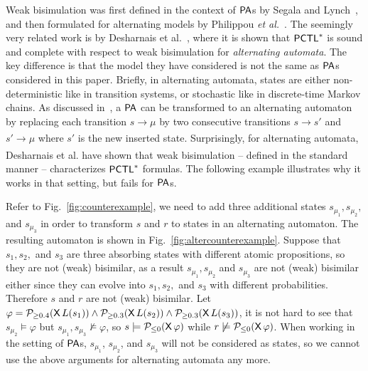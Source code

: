 \documentclass{LMCS}
\def\phi{\varphi}
\DeclareMathOperator{\X}{\text{\sf X}}
\newcommand{\TRANA}[3]{#1\xrightarrow[]{#2}#3}
\newcommand{\PA}{{\sf PA}}
\newcommand{\PCTL}{{\sf PCTL}}
\newcommand{\MC}[1]{\mathcal{#1}}
\begin{document}
Weak bisimulation was first defined in the context of $\PA$s by
Segala and Lynch~\cite{SegalaL95}, and then formulated for alternating models by
Philippou \emph{et al.}~\cite{PhilippouLS00}.
The seemingly very related work is by Desharnais et
al.~\cite{DesharnaisGJP10}, where it is shown that $\PCTL^{*}$ is sound and
complete with respect to weak bisimulation for \emph{alternating
automata}. The key difference is that the model they have considered is not
the same as $\PA$s considered in this paper. Briefly,
in alternating automata, states are either non-deterministic like in
transition systems, or stochastic like in discrete-time Markov chains.
As discussed in~\cite{SegalaT05}, a $\PA$ can be
transformed to an alternating automaton by replacing each transition
$\TRANA{s}{}{ \mu}$ by two consecutive transitions $\TRANA{s}{}{s'}$
and $\TRANA{s'}{}{\mu}$ where $s'$ is the new inserted
state. Surprisingly, for alternating automata, Desharnais et al. have
shown that weak bisimulation -- defined in the standard manner --
characterizes $\PCTL^{*}$ formulas. The following example illustrates why it
works in that setting, but fails for $\PA$s.
\begin{exa}\label{ex:alternative PA}
  Refer to Fig.~\ref{fig:counterexample}, we need to add three
  additional states $s_{\mu_1},s_{\mu_2},$ and $s_{\mu_3}$ in order to
  transform $s$ and $r$ to states in an alternating automaton. 
  The resulting
  automaton is shown in Fig.~\ref{fig:altercounterexample}.  Suppose
  that $s_1,s_2,$ and $s_3$ are three absorbing states with different
  atomic propositions, so they are not (weak) bisimilar, as a result
  $s_{\mu_1},s_{\mu_2}$ and $s_{\mu_3}$ are not (weak) bisimilar
  either since they can evolve into $s_1,s_2,$ and $s_3$ with
  different probabilities. Therefore $s$ and $r$ are not (weak)
  bisimilar. Let $\phi=\MC{P}_{\geq0.4}(\X L(s_1))\land
  \MC{P}_{\geq0.3}(\X L(s_2))\land \MC{P}_{\geq0.3}(\X L(s_3))$, it is
  not hard to see that $s_{\mu_2}\models\phi$ but
  $s_{\mu_1},s_{\mu_3}\not\models\phi$, so $s\models \MC{P}_{\leq
    0}(\X\phi)$ while $r\not\models\MC{P}_{\leq 0}(\X\phi)$. When
  working in the setting of $\PA$s, $s_{\mu_1}$,
  $s_{\mu_2}$, and $s_{\mu_3}$ will not be considered as states, so we
  cannot use the above arguments for alternating automata any more.
\end{exa}
\end{document}
